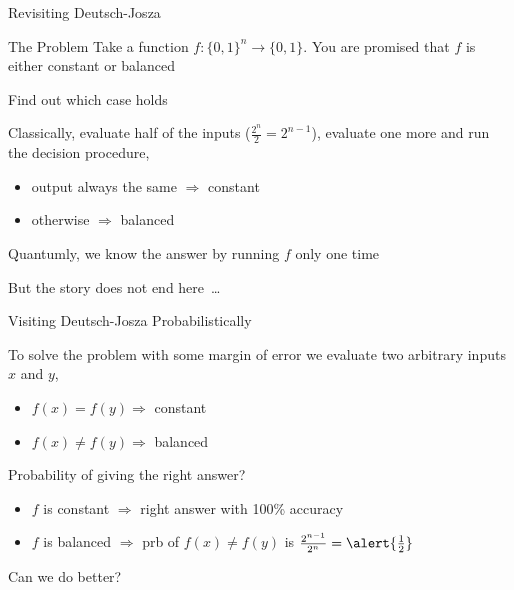 \documentclass{beamer}
\begin{document}
\begin{frame}{Revisiting Deutsch-Josza}
        \begin{block}{The Problem}
                Take a function $f : \{0,1\}^n \to \{0,1\}$.
                You are promised that $f$ is either constant or balanced

                Find out which case holds
        \end{block}
        
        Classically, evaluate half of the inputs ($\frac{2^{n}}{2} = 2^{n-1}$),
        evaluate one more and run the decision procedure,
        \begin{itemize}
                \item output always the same $\Longrightarrow$ constant
                \item otherwise $\Longrightarrow$ balanced
        \end{itemize}

        Quantumly, we know the answer by running $f$ only one time 

        \pause
        But the story does not end here\ \dots
\end{frame}

\begin{frame}{Visiting Deutsch-Josza Probabilistically}

        To solve the problem with \alert{some margin of error} we evaluate
        two arbitrary inputs $x$ and $y$,
        \begin{itemize}
                \item $f(x) = f(y) \Longrightarrow$ constant
                \item $f(x) \not = f(y) \Longrightarrow$ balanced
        \end{itemize}
        \pause
        Probability of giving the right answer?

        \pause
        \begin{itemize}
                \item $f$ is constant $\Longrightarrow$  right answer
                        with 100\% accuracy
                \item $f$ is balanced $\Longrightarrow$ prb of 
                        $f(x) \not = f(y)$ is 
                        $\frac{2^{n-1}}{2^n} = \alert{\frac{1}{2}}$
        \end{itemize}

        \pause
        Can we do better?
\end{frame}
\end{document}
